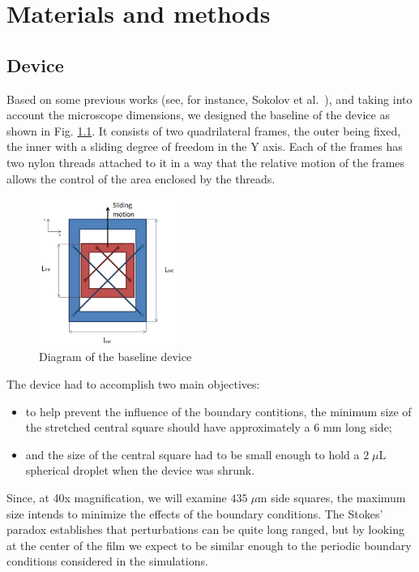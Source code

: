 \chapter{Materials and methods}
\label{materias_methods}

\section{Device}

Based on some previous works (see, for instance, Sokolov et al.~\cite{Sokolov2007}), and taking into account the microscope dimensions, we designed the baseline of the device as shown in Fig. \ref{device_baseline}. It consists of two quadrilateral frames, the outer being fixed, the inner with a sliding degree of freedom in the Y axis. Each of the frames has two nylon threads attached to it in a way that the relative motion of the frames allows the control of the area enclosed by the threads.

\begin{figure}[H]
	\centering
	\includegraphics[width=0.4\textwidth]{archivos/baseline_device.png}
	\caption{Diagram of the baseline device}
	\label{device_baseline}
\end{figure}

The device had to accomplish two main objectives: 

\begin{itemize}
	\item to help prevent the influence of the boundary contitions, the minimum size of the stretched central square should have approximately a $6 \; \textrm{mm}$ long side; 
	\item and the size of the central square had to be small enough to hold a $2 \; \mu \textrm{L}$ spherical droplet when the device was shrunk. 
\end{itemize}

Since, at 40x magnification, we will examine $435 \; \mu \textrm{m}$ side squares, the maximum size intends to minimize the effects of the boundary conditions. The Stokes' paradox establishes that perturbations can be quite long ranged, but by looking at the center of the film we expect to be similar enough to the periodic boundary conditions considered in the simulations.

